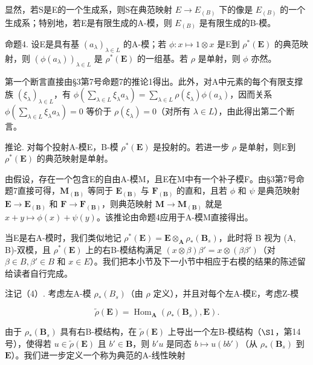 显然，若S是E的一个生成系，则S在典范映射 \(E \rightarrow E_{(B)}\) 下的像是 \(E_{(B)}\) 的一个生成系；特别地，若E是有限生成的A-模，则 \(E_{(B)}\) 是有限生成的B-模。

命题4. 设E是具有基 \((a_{\lambda})_{\lambda \in L}\) 的A-模；若 \(\phi : x \mapsto 1 \otimes x\) 是E到 \(\rho^{*}(\mathbf{E})\) 的典范映射，则 \((\phi(a_{\lambda}))_{\lambda \in L}\) 是 \(\rho^{*}(\mathbf{E})\) 的一组基。若 \(\rho\) 是单射，则 \(\phi\) 亦然。

第一个断言直接由§3第7号命题7的推论1得出。此外，对A中元素的每个有限支撑族 \((\xi_{\lambda})_{\lambda \in L}\)，有 \(\phi\left(\sum_{\lambda \in L} \xi_{\lambda} a_{\lambda}\right) = \sum_{\lambda \in L} \rho(\xi_{\lambda}) \phi(a_{\lambda})\)，因而关系 \(\phi\left(\sum_{\lambda \in L} \xi_{\lambda} a_{\lambda}\right) = 0\) 等价于 \(\rho(\xi_{\lambda}) = 0\)（对所有 \(\lambda \in L\)），由此得出第二个断言。

推论. 对每个投射A-模E，B-模 \(\rho^{*}(\mathbf{E})\) 是投射的。若进一步 \(\rho\) 是单射，则E到 \(\rho^{*}(\mathbf{E})\) 的典范映射是单射。

由假设，存在一个包含E的自由A-模M，且E在M中有一个补子模F。由§3第7号命题7直接可得，\(\mathbf{M}_{(\mathbf{B})}\) 等同于 \(\mathbf{E}_{(\mathbf{B})}\) 与 \(\mathbf{F}_{(\mathbf{B})}\) 的直和，且若 \(\phi\) 和 \(\psi\) 是典范映射 \(\mathbf{E} \to \mathbf{E}_{(\mathbf{B})}\) 和 \(\mathbf{F} \to \mathbf{F}_{(\mathbf{B})}\)，则典范映射 \(\mathbf{M} \to \mathbf{M}_{(\mathbf{B})}\) 就是 \(x + y \mapsto \phi(x) + \psi(y)\)。该推论由命题4应用于A-模M直接得出。

当E是右A-模时，我们类似地记 \(\rho^{*}(\mathbf{E}) = \mathbf{E} \otimes_{\mathbf{A}} \rho_{*}(\mathbf{B}_{s})\)，此时将 B 视为 (A, B)-双模，且 \(\rho^{*}(\mathbf{E})\) 上的右B-模结构满足 \((x \otimes \beta)\beta' = x \otimes (\beta\beta')\)（对 \(\beta \in B, \beta' \in B\) 和 \(x \in E\)）。我们把本小节及下一小节中相应于右模的结果的陈述留给读者自行完成。

注记（4）. 考虑左A-模 \(\rho_{*}(B_{s})\)（由 \(\rho\) 定义），并且对每个左A-模E，考虑Z-模

\[
\tilde {\rho} (\mathbf {E}) = \operatorname{Hom} _ {\mathbf {A}} \left(\rho_ {*} \left(\mathbf {B} _ {s}\right), \mathbf {E}\right).\tag{6}
\]

由于 \(\rho_{*}(\mathbf{B}_{s})\) 具有右B-模结构，在 \(\tilde{\rho}(\mathbf{E})\) 上导出一个左B-模结构（\(\S 1\)，第14号），使得若 \(u \in \tilde{\rho}(\mathbf{E})\) 且 \(b' \in \mathbf{B}\)，则 \(b'u\) 是同态 \(b \mapsto u(bb')\)（从 \(\rho_{*}(\mathbf{B}_{s})\) 到 \(\mathbf{E}\)）。我们进一步定义一个称为典范的A-线性映射

